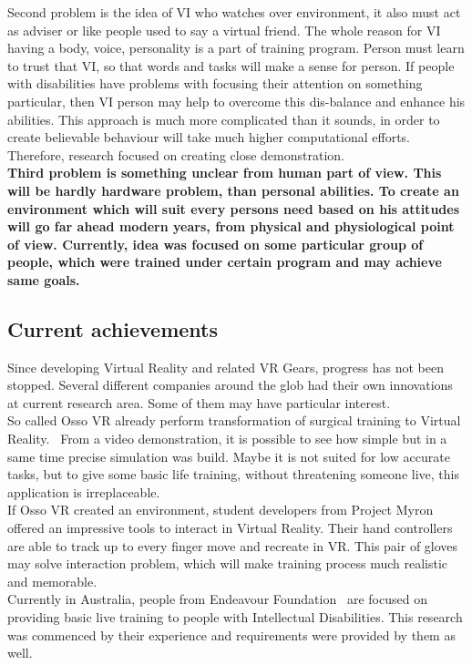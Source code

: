 \documentclass[18pt]{article}
\numberwithin{equation}{section} %
\numberwithin{figure}{section} %
\numberwithin{table}{section} %
\begin{document}
		Second problem is the idea of VI who watches over environment, it also must act as adviser or like people used to say a virtual friend. The whole reason for VI having a body, voice, personality is a part of training program. Person must learn to trust that VI, so that words and tasks will make a sense for person. If people with disabilities have problems with focusing their attention on something particular, then VI person may help to overcome this dis-balance and enhance his abilities. This approach is much more complicated than it sounds, in order to create believable behaviour will take much higher computational efforts. Therefore, research focused on creating close demonstration.\\
		
		\textbf{Third problem is something unclear from human part of view. This will be hardly hardware problem, than personal abilities. To create an environment which will suit every persons need based on his attitudes will go far ahead modern years, from physical and physiological point of view. Currently, idea was focused on some particular group of people, which were trained under certain program and may achieve same goals.} \\
	
	\subsection{Current achievements}		
		Since developing Virtual Reality and related VR Gears, progress has not been stopped. Several different companies around the glob had their own innovations at current research area. Some of them may have particular interest. \\
		So called Osso VR already perform transformation of surgical training to Virtual Reality.~\cite{OssoVR} From a video demonstration, it is possible to see how simple but in a same time precise simulation was build. Maybe it is not suited for low accurate tasks, but to give some basic life training, without threatening someone live, this application is irreplaceable. \\	
		If Osso VR created an environment, student developers from Project Myron~\cite{Myron} offered an impressive tools to interact in Virtual Reality. Their hand controllers are able to track up to every finger move and recreate in VR. This pair of gloves may solve interaction problem, which will make training process much realistic and memorable. \\
		Currently in Australia, people from Endeavour Foundation~\cite{Endeav} are focused on providing basic live training to people with Intellectual Disabilities. This research was commenced by their experience and requirements were provided by them as well. \\
		
\end{document}
